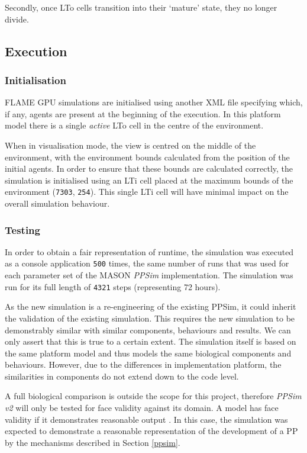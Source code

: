 \documentclass{UoYCSproject}
\begin{document}
Secondly, once \gls{LTo} cells transition into their `mature' state, they no longer divide.

\subsection{Execution}
\subsubsection{Initialisation}
\gls{FLAME GPU} simulations are initialised using another XML file specifying which, if any, agents are present at the beginning of the execution.
In this platform model there is a single \textit{active} \gls{LTo} cell in the centre of the environment.

When in visualisation mode, the view is centred on the middle of the environment, with the environment bounds calculated from the position of the initial agents.
In order to ensure that these bounds are calculated correctly, the simulation is initialised using an \gls{LTi} cell placed at the maximum bounds of the environment (\texttt{7303}, \texttt{254}).
This single \gls{LTi} cell will have minimal impact on the overall simulation behaviour.

\subsubsection{Testing}
In order to obtain a fair representation of runtime, the simulation was executed as a console application \texttt{500} times, the same number of runs that was used for each parameter set of the MASON \textit{PPSim} implementation.
The simulation was run for its full length of \texttt{4321} steps (representing 72 hours).

As the new simulation is a re-engineering of the existing PPSim, it could inherit the validation of the existing simulation.
This requires the new simulation to be demonstrably similar with similar components, behaviours and results.
We can only assert that this is true to a certain extent.
The simulation itself is based on the same platform model and thus models the same biological components and behaviours.
However, due to the differences in implementation platform, the similarities in components do not extend down to the code level.

A full biological comparison is outside the scope for this project, therefore \textit{PPSim v2} will only be tested for face validity against its \gls{domain}.
A model has face validity if it demonstrates reasonable output \cite{model_validity}.
In this case, the simulation was expected to demonstrate a reasonable representation of the development of a \gls{PP} by the mechanisms described in Section \ref{ppsim}.
\end{document}
